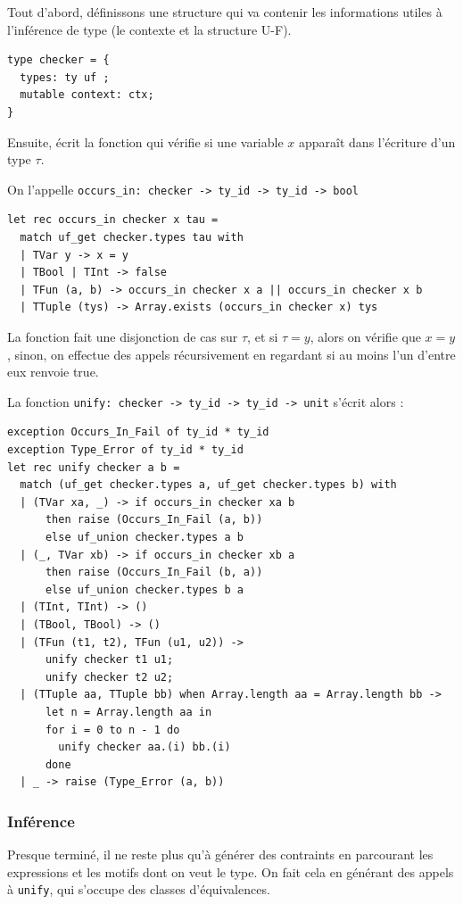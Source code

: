\documentclass[11pt]{article}
\begin{document}
Tout d'abord, définissons une structure qui va contenir les informations utiles à l'inférence de type (le contexte et la structure U-F).

\begin{lstlisting}
type checker = {
  types: ty uf ;
  mutable context: ctx;
}
\end{lstlisting}

Ensuite, écrit la fonction qui vérifie si une variable $x$ apparaît dans l'écriture d'un type $\tau$.

On l'appelle \verb|occurs_in: checker -> ty_id -> ty_id -> bool|

\begin{lstlisting}
let rec occurs_in checker x tau =
  match uf_get checker.types tau with
  | TVar y -> x = y
  | TBool | TInt -> false
  | TFun (a, b) -> occurs_in checker x a || occurs_in checker x b
  | TTuple (tys) -> Array.exists (occurs_in checker x) tys
\end{lstlisting}

La fonction fait une disjonction de cas sur $\tau$, et si $\tau=y$, alors on vérifie que $x=y$, sinon, on effectue des appels récursivement en regardant si au moins l'un d'entre eux renvoie true.

La fonction \verb|unify: checker -> ty_id -> ty_id -> unit| s'écrit alors :
\begin{lstlisting}
exception Occurs_In_Fail of ty_id * ty_id
exception Type_Error of ty_id * ty_id
let rec unify checker a b =
  match (uf_get checker.types a, uf_get checker.types b) with
  | (TVar xa, _) -> if occurs_in checker xa b
      then raise (Occurs_In_Fail (a, b))
      else uf_union checker.types a b
  | (_, TVar xb) -> if occurs_in checker xb a
      then raise (Occurs_In_Fail (b, a))
      else uf_union checker.types b a
  | (TInt, TInt) -> ()
  | (TBool, TBool) -> ()
  | (TFun (t1, t2), TFun (u1, u2)) ->
      unify checker t1 u1;
      unify checker t2 u2;
  | (TTuple aa, TTuple bb) when Array.length aa = Array.length bb -> 
      let n = Array.length aa in
      for i = 0 to n - 1 do
        unify checker aa.(i) bb.(i)
      done
  | _ -> raise (Type_Error (a, b))
\end{lstlisting}

\subsubsection{Inférence}

Presque terminé, il ne reste plus qu'à générer des contraints en parcourant les expressions et les motifs dont on veut le type. On fait cela en générant des appels à \verb|unify|, qui s'occupe des classes d'équivalences.
\end{document}
